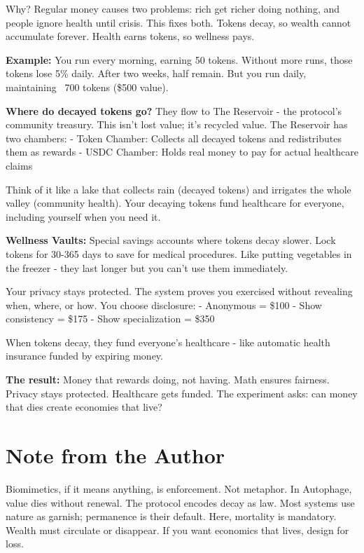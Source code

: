 \documentclass[11pt,letterpaper]{article}
\begin{document}
Why? Regular money causes two problems: rich get richer doing nothing, and people ignore health until crisis. This fixes both. Tokens decay, so wealth cannot accumulate forever. Health earns tokens, so wellness pays.

\textbf{Example:} You run every morning, earning 50 tokens. Without more runs, those tokens lose 5\% daily. After two weeks, half remain. But you run daily, maintaining ~700 tokens (\$500 value).

\textbf{Where do decayed tokens go?} They flow to The Reservoir - the protocol's community treasury. This isn't lost value; it's recycled value. The Reservoir has two chambers:
- Token Chamber: Collects all decayed tokens and redistributes them as rewards
- USDC Chamber: Holds real money to pay for actual healthcare claims

Think of it like a lake that collects rain (decayed tokens) and irrigates the whole valley (community health). Your decaying tokens fund healthcare for everyone, including yourself when you need it.

\textbf{Wellness Vaults:} Special savings accounts where tokens decay slower. Lock tokens for 30-365 days to save for medical procedures. Like putting vegetables in the freezer - they last longer but you can't use them immediately.

Your privacy stays protected. The system proves you exercised without revealing when, where, or how. You choose disclosure:
- Anonymous = \$100
- Show consistency = \$175  
- Show specialization = \$350

When tokens decay, they fund everyone's healthcare - like automatic health insurance funded by expiring money.

\textbf{The result:} Money that rewards doing, not having. Math ensures fairness. Privacy stays protected. Healthcare gets funded. The experiment asks: can money that dies create economies that live?

\section*{Note from the Author}

Biomimetics, if it means anything, is enforcement. Not metaphor. In Autophage, value dies without renewal. The protocol encodes decay as law. Most systems use nature as garnish; permanence is their default. Here, mortality is mandatory. Wealth must circulate or disappear. If you want economics that lives, design for loss.
\end{document}
